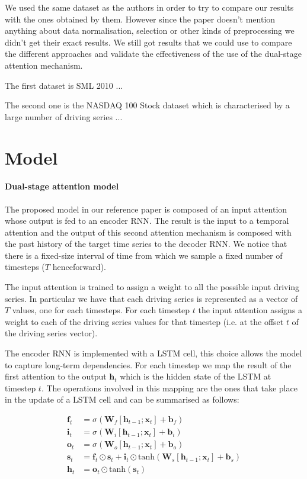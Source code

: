\documentclass{article}
\begin{document}
We used the same dataset as the authors in order to try to compare our results 
with the ones obtained by them. However
since the paper doesn't mention anything about data normalisation, selection or 
other kinds of preprocessing we didn't 
get their exact results. We still got results that we could use to compare the 
different approaches and validate the 
effectiveness of the use of the dual-stage attention mechanism.

The first dataset is SML 2010 ...

The second one is the NASDAQ 100 Stock dataset which is characterised by a 
large number of driving series ...


\section{Model}
\label{sec:model}

\paragraph{Dual-stage attention model}

The proposed model in our reference paper is composed of an input attention 
whose output is fed to an encoder RNN. The 
result is the input to a temporal attention and the output of this second 
attention mechanism is composed with the 
past history of the target time series to the decoder RNN. We notice that there 
is a fixed-size interval of time from
which we sample a fixed number of timesteps ($T$ henceforward).

The input attention is trained to assign a weight to all the possible input 
driving series. In particular we have 
that each driving series is represented as a vector of $T$ values, one for each 
timesteps. For each timestep $t$ the 
input attention assigns a weight to each of the driving series values for that 
timestep (i.e. at the offset $t$ of the
driving series vector).

The encoder RNN is implemented with a LSTM cell, this choice allows the model 
to capture long-term dependencies. 
For each timestep we map the result of the first attention to the output 
$\mathbf{h}_t$ which is the hidden state of 
the LSTM at timestep $t$. The operations involved in this mapping are the ones 
that take place in the update of a LSTM
cell and can be summarised as follows:


\begin{equation} \label{eq:lstm}
\begin{split}
\mathbf{f}_t &= \sigma (\mathbf{W}_f[\mathbf{h}_{t-1};\mathbf{x}_t] + 
\mathbf{b}_f) \\
\mathbf{i}_t &= \sigma (\mathbf{W}_i[\mathbf{h}_{t-1};\mathbf{x}_t] + 
\mathbf{b}_i) \\
\mathbf{o}_t &= \sigma (\mathbf{W}_o[\mathbf{h}_{t-1};\mathbf{x}_t] + 
\mathbf{b}_o) \\
\mathbf{s}_t &= \mathbf{f}_t \odot \mathbf{s}_t + \mathbf{i}_t 
				\odot 
\text{tanh}(\mathbf{W}_s[\mathbf{h}_{t-1};\mathbf{x}_t] + \mathbf{b}_s) \\
\mathbf{h}_t &= \mathbf{o}_t \odot \text{tanh}(\mathbf{s}_t)
\end{split}
\end{equation}
\end{document}
